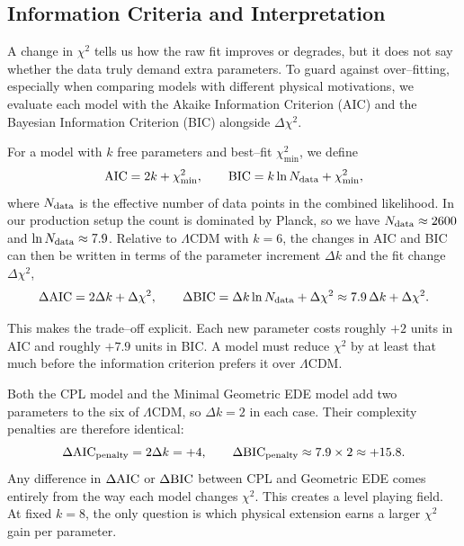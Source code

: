 \documentclass[a4paper,11pt]{article}
\begin{document}

\subsection{Information Criteria and Interpretation}
\label{sec:aic_bic}

A change in $\chi^2$ tells us how the raw fit improves or degrades, but it does not say whether the data truly demand extra parameters. To guard against over--fitting, especially when comparing models with different physical motivations, we evaluate each model with the Akaike Information Criterion (AIC) and the Bayesian Information Criterion (BIC) alongside $\Delta\chi^2$.

For a model with $k$ free parameters and best--fit $\chi^2_{\min}$, we define
\begin{equation}
{\rm AIC} = 2k + \chi^2_{\min}, \qquad {\rm BIC} = k \ln N_{\rm data} + \chi^2_{\min},
\end{equation}
where $N_{\rm data}$ is the effective number of data points in the combined likelihood. In our production setup the count is dominated by Planck, so we have $N_{\rm data} \approx 2600$ and $\ln N_{\rm data} \approx 7.9$. Relative to $\Lambda$CDM with $k = 6$, the changes in AIC and BIC can then be written in terms of the parameter increment $\Delta k$ and the fit change $\Delta\chi^2$,
\begin{equation}
\Delta{\rm AIC} = 2\Delta k + \Delta\chi^2, \qquad \Delta{\rm BIC} = \Delta k \ln N_{\rm data} + \Delta\chi^2 \approx 7.9\,\Delta k + \Delta\chi^2.
\end{equation}

This makes the trade--off explicit. Each new parameter costs roughly $+2$ units in AIC and roughly $+7.9$ units in BIC. A model must reduce $\chi^2$ by at least that much before the information criterion prefers it over $\Lambda$CDM.

Both the CPL model and the Minimal Geometric EDE model add two parameters to the six of $\Lambda$CDM, so $\Delta k = 2$ in each case. Their complexity penalties are therefore identical:
\begin{equation}
\Delta{\rm AIC}_{\rm penalty} = 2\Delta k = +4, \qquad \Delta{\rm BIC}_{\rm penalty} \approx 7.9 \times 2 \approx +15.8.
\end{equation}
Any difference in $\Delta{\rm AIC}$ or $\Delta{\rm BIC}$ between CPL and Geometric EDE comes entirely from the way each model changes $\chi^2$. This creates a level playing field. At fixed $k = 8$, the only question is which physical extension earns a larger $\chi^2$ gain per parameter.
\end{document}

